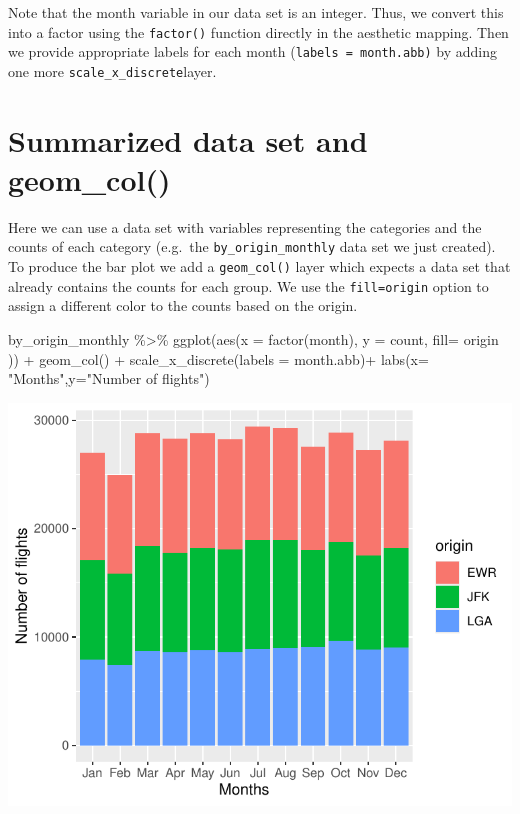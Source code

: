 \documentclass[
  letterpaper,
  DIV=11,
  numbers=noendperiod]{scrartcl}
\newenvironment{Shaded}{\begin{snugshade}}{\end{snugshade}}
\newcommand{\AttributeTok}[1]{\textcolor[rgb]{0.40,0.45,0.13}{#1}}
\newcommand{\FunctionTok}[1]{\textcolor[rgb]{0.28,0.35,0.67}{#1}}
\newcommand{\NormalTok}[1]{\textcolor[rgb]{0.00,0.23,0.31}{#1}}
\newcommand{\SpecialCharTok}[1]{\textcolor[rgb]{0.37,0.37,0.37}{#1}}
\newcommand{\StringTok}[1]{\textcolor[rgb]{0.13,0.47,0.30}{#1}}
\begin{document}
Note that the month variable in our data set is an integer. Thus, we
convert this into a factor using the \texttt{factor()} function directly
in the aesthetic mapping. Then we provide appropriate labels for each
month (\texttt{labels\ =\ month.abb)} by adding one more
\texttt{scale\_x\_discrete}layer.

\section{Summarized data set and geom\_col()}

Here we can use a data set with variables representing the categories
and the counts of each category (e.g.~the \texttt{by\_origin\_monthly}
data set we just created). To produce the bar plot we add a
\texttt{geom\_col()} layer which expects a data set that already
contains the counts for each group. We use the \texttt{fill=origin}
option to assign a different color to the counts based on the origin.

\begin{Shaded}
\begin{Highlighting}[]
\NormalTok{by\_origin\_monthly }\SpecialCharTok{\%\textgreater{}\%}
\FunctionTok{ggplot}\NormalTok{(}\FunctionTok{aes}\NormalTok{(}\AttributeTok{x =} \FunctionTok{factor}\NormalTok{(month), }\AttributeTok{y =}\NormalTok{ count, }\AttributeTok{fill=}\NormalTok{ origin )) }\SpecialCharTok{+}
  \FunctionTok{geom\_col}\NormalTok{() }\SpecialCharTok{+}
  \FunctionTok{scale\_x\_discrete}\NormalTok{(}\AttributeTok{labels =}\NormalTok{ month.abb)}\SpecialCharTok{+}
    \FunctionTok{labs}\NormalTok{(}\AttributeTok{x=} \StringTok{"Months"}\NormalTok{,}\AttributeTok{y=}\StringTok{"Number of flights"}\NormalTok{)}
\end{Highlighting}
\end{Shaded}

\begin{center}
\includegraphics{notes_files/figure-pdf/Barplot for aggregated count data-1.pdf}
\end{center}
\end{document}
